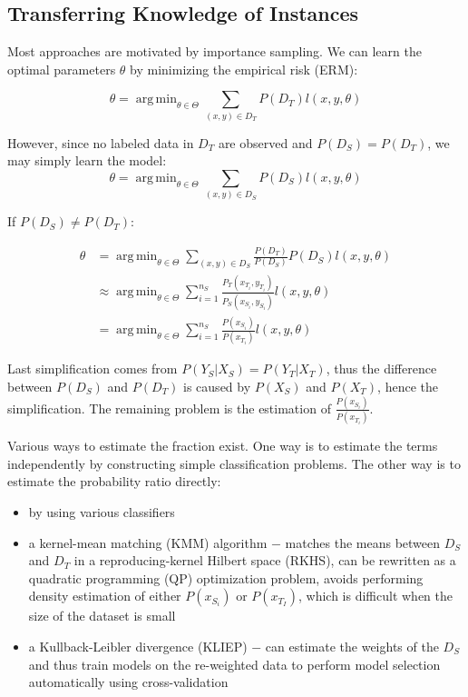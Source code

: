 \documentclass[a4paper,twocolumn]{article}
\DeclareMathOperator*{\argmin}{arg\,min}
\begin{document}
\subsection{Transferring Knowledge of Instances}
Most approaches are motivated by importance sampling. We can learn the optimal parameters $\theta$ by minimizing the empirical risk (ERM):

\[
    \theta = \argmin_{\theta \in \Theta} \sum_{(x,y) \in D_T} P(D_T)l(x, y, \theta)
\]

However, since no labeled data in $D_T$ are observed and $P(D_S) = P(D_T)$, we may simply learn the model:
\[
    \theta = \argmin_{\theta \in \Theta} \sum_{(x,y) \in D_S} P(D_S)l(x, y, \theta)
\]

If $P(D_S) \ne P(D_T)$:

\begin{align*}
    \theta &= \argmin_{\theta \in \Theta} \sum_{(x,y) \in D_S} \frac{P(D_T)}{P(D_S)}P(D_S)l(x, y, \theta) \\
           &\approx \argmin_{\theta \in \Theta} \sum_{i = 1}^{n_S} \frac{P_T(x_{T_i}, y_{T_i})}{P_S(x_{S_i}, y_{S_i})}l(x, y, \theta) \\
           &= \argmin_{\theta \in \Theta} \sum_{i = 1}^{n_S} \frac{P(x_{S_i})}{P(x_{T_i})}l(x, y, \theta)
\end{align*}

Last simplification comes from $P(Y_S|X_S) = P(Y_T|X_T)$, thus the difference between $P(D_S)$ and $P(D_T)$ is caused by $P(X_S)$ and $P(X_T)$, hence the simplification. The remaining problem is the estimation of $\frac{P(x_{S_i})}{P(x_{T_i})}$.

Various ways to estimate the fraction exist. One way is to estimate the terms independently by constructing simple classification problems. The other way is to estimate the probability ratio directly:
\begin{itemize}
    \item by using various classifiers
    \item a kernel-mean matching (KMM) algorithm $-$ matches the means between $D_S$ and $D_T$ in a reproducing-kernel Hilbert space (RKHS), can be rewritten as a quadratic programming (QP) optimization problem, avoids performing density estimation of either $P(x_{S_i})$ or $P(x_{T_I})$, which is difficult when the size of the dataset is small
    \item a Kullback-Leibler divergence (KLIEP) $-$ can estimate the weights of the $D_S$ and thus train models on the re-weighted data to perform model selection automatically using cross-validation
\end{itemize}
\end{document}

